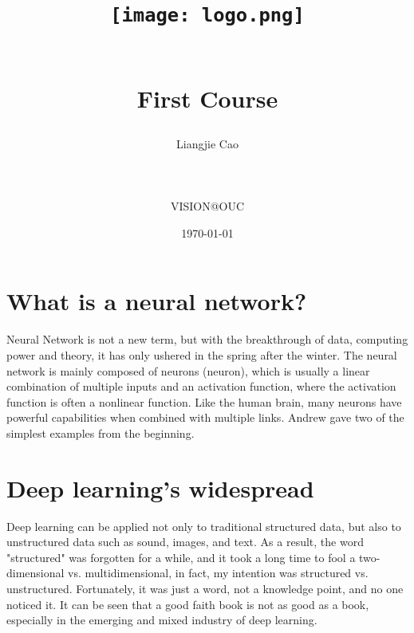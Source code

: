 \documentclass[a4paper]{article}
\begin{document}
\title{
\begin{figure}[!htb]
 \centering
 \texttt{[image: logo.png]}\\
 \end{figure}\\First Course}
\author{Liangjie Cao   \\\\\\\\ VISION@OUC}
\date{\today}
\maketitle
\newpage
\section{What is a neural network?}
Neural Network is not a new term, but with the breakthrough of data, computing power and theory, it has only ushered in the spring after the winter. The neural network is mainly composed of neurons (neuron), which is usually a linear combination of multiple inputs and an activation function, where the activation function is often a nonlinear function. Like the human brain, many neurons have powerful capabilities when combined with multiple links. Andrew gave two of the simplest examples from the beginning.
\section{Deep learning's widespread}
Deep learning can be applied not only to traditional structured data, but also to unstructured data such as sound, images, and text. As a result, the word "structured" was forgotten for a while, and it took a long time to fool a two-dimensional vs. multidimensional, in fact, my intention was structured vs. unstructured. Fortunately, it was just a word, not a knowledge point, and no one noticed it. It can be seen that a good faith book is not as good as a book, especially in the emerging and mixed industry of deep learning.
\end{document}
